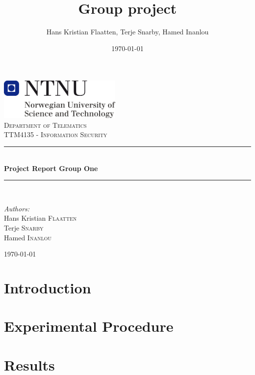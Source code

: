 \documentclass[a4paper, 12pt]{article}
\title{Group project}
\author{Hans Kristian Flaatten, Terje Snarby, Hamed Inanlou }
\date{\today}
\begin{document}
\begin{titlepage}
\begin{center}
\includegraphics[width=0.45\textwidth]{./img/NTNU-logo.png}\\[5cm]
\textsc{\large Department of Telematics}\\[0.2cm]
\textsc{\Large TTM4135 - Information Security}\\[0.5cm]

\rule{\linewidth}{0.2mm} \\[0.4cm]
{ \LARGE \bfseries Project Report Group One}\\[0.2cm]
\rule{\linewidth}{0.2mm} \\[1.5cm]

\begin{minipage}{0.4\textwidth}
\begin{flushleft} \large
\emph{Authors:}\\
Hans Kristian \textsc{Flaatten}\\
Terje \textsc{Snarby}\\
Hamed \textsc{Inanlou}
\end{flushleft}
\end{minipage}

\vfill
{\large \today}
\end{center}
\end{titlepage}


\section{Introduction}


\section{Experimental Procedure}


\section{Results}
\end{document}
